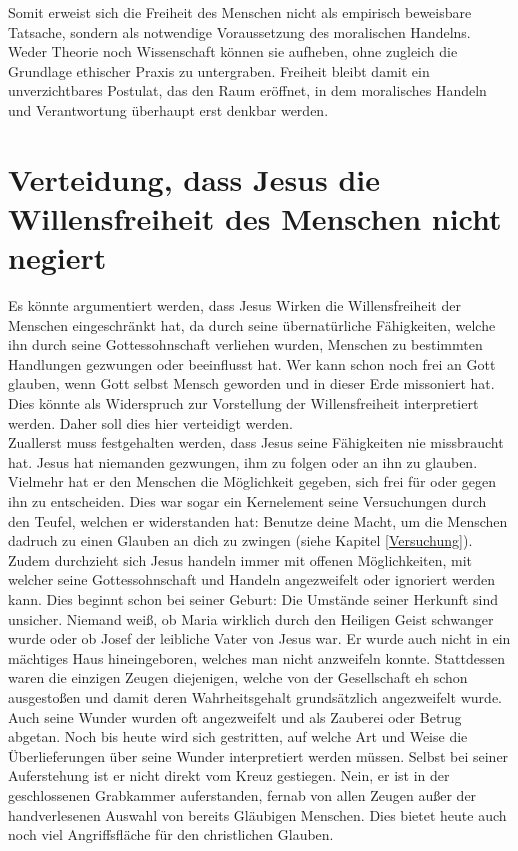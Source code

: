 Somit erweist sich die Freiheit des Menschen nicht als empirisch beweisbare Tatsache, sondern als notwendige Voraussetzung des moralischen Handelns. Weder Theorie noch Wissenschaft können sie aufheben, ohne zugleich die Grundlage ethischer Praxis zu untergraben. Freiheit bleibt damit ein unverzichtbares Postulat, das den Raum eröffnet, in dem moralisches Handeln und Verantwortung überhaupt erst denkbar werden.

\section{Verteidung, dass Jesus die Willensfreiheit des Menschen nicht negiert}
Es könnte argumentiert werden, dass Jesus Wirken die Willensfreiheit der Menschen eingeschränkt hat, da durch seine übernatürliche Fähigkeiten, welche ihn durch seine Gottessohnschaft verliehen wurden, Menschen zu bestimmten Handlungen gezwungen oder beeinflusst hat. Wer kann schon noch frei an Gott glauben, wenn Gott selbst Mensch geworden und in dieser Erde missoniert hat. Dies könnte als Widerspruch zur Vorstellung der Willensfreiheit interpretiert werden. Daher soll dies hier verteidigt werden.\\

Zuallerst muss festgehalten werden, dass Jesus seine Fähigkeiten nie missbraucht hat. Jesus hat niemanden gezwungen, ihm zu folgen oder an ihn zu glauben. Vielmehr hat er den Menschen die Möglichkeit gegeben, sich frei für oder gegen ihn zu entscheiden. Dies war sogar ein Kernelement seine Versuchungen durch den Teufel, welchen er widerstanden hat: Benutze deine Macht, um die Menschen dadruch zu einen Glauben an dich zu zwingen (siehe Kapitel \ref{Versuchung}).\\

Zudem durchzieht sich Jesus handeln immer mit offenen Möglichkeiten, mit welcher seine Gottessohnschaft und Handeln angezweifelt oder ignoriert werden kann. Dies beginnt schon bei seiner Geburt: Die Umstände seiner Herkunft sind unsicher. Niemand weiß, ob Maria wirklich durch den Heiligen Geist schwanger wurde oder ob Josef der leibliche Vater von Jesus war. Er wurde auch nicht in ein mächtiges Haus hineingeboren, welches man nicht anzweifeln konnte. Stattdessen waren die einzigen Zeugen diejenigen, welche von der Gesellschaft eh schon ausgestoßen und damit deren Wahrheitsgehalt grundsätzlich angezweifelt wurde. \\

Auch seine Wunder wurden oft angezweifelt und als Zauberei oder Betrug abgetan. Noch bis heute wird sich gestritten, auf welche Art und Weise die Überlieferungen über seine Wunder interpretiert werden müssen. Selbst bei seiner Auferstehung ist er nicht direkt vom Kreuz gestiegen. Nein, er ist in der geschlossenen Grabkammer auferstanden, fernab von allen Zeugen außer der handverlesenen Auswahl von bereits Gläubigen Menschen. Dies bietet heute auch noch viel Angriffsfläche für den christlichen Glauben.\\

